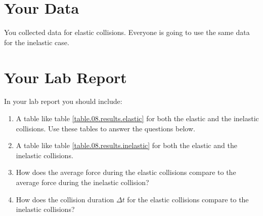 \section{Your Data}
You collected data for elastic collisions. Everyone is going to use the same data for the inelastic case.
\section{Your Lab Report}
In your lab report you should include:
\begin{enumerate}
    \item A table like table \ref{table.08.results.elastic} for both the elastic and the inelastic collisions. Use these tables to answer the questions below.
    \item A table like table \ref{table.08.results.inelastic} for both the elastic and the inelastic collisions.
    \item How does the average force during the elastic collisions compare to the average force during the inelastic collision?
    \item How does the collision duration $\Delta t$ for the elastic collisions compare to the inelastic collisions?
\end{enumerate}